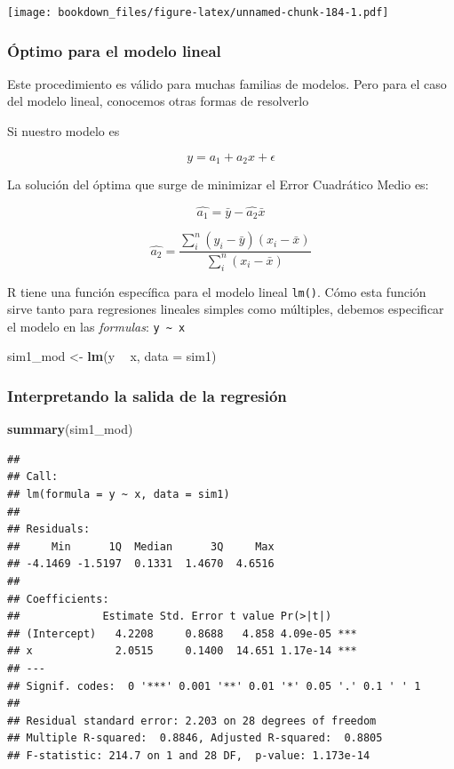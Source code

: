 \documentclass[]{book}
\newenvironment{Shaded}{\begin{snugshade}}{\end{snugshade}}
\newcommand{\DataTypeTok}[1]{\textcolor[rgb]{0.13,0.29,0.53}{#1}}
\newcommand{\KeywordTok}[1]{\textcolor[rgb]{0.13,0.29,0.53}{\textbf{#1}}}
\newcommand{\NormalTok}[1]{#1}
\newcommand{\OperatorTok}[1]{\textcolor[rgb]{0.81,0.36,0.00}{\textbf{#1}}}
\newcommand{\StringTok}[1]{\textcolor[rgb]{0.31,0.60,0.02}{#1}}
\begin{document}
\texttt{[image: bookdown\_files/figure-latex/unnamed-chunk-184-1.pdf]}

\hypertarget{optimo-para-el-modelo-lineal}{%
\subsubsection{Óptimo para el modelo lineal}\label{optimo-para-el-modelo-lineal}}

Este procedimiento es válido para muchas familias de modelos. Pero para el caso del modelo lineal, conocemos otras formas de resolverlo

Si nuestro modelo es

\[
y = a_1 + a_2x + \epsilon
\]

La solución del óptima que surge de minimizar el Error Cuadrático Medio es:

\[
\hat{a_1} = \bar{y} - \hat{a_2}\bar{x} 
\]

\[
\hat{a_2} = \frac{\sum_i^n (y_i -\bar{y})(x_i -\bar{x})}{\sum_i^n (x_i- \bar{x})}
\]

R tiene una función específica para el modelo lineal \texttt{lm()}. Cómo esta función sirve tanto para regresiones lineales simples como múltiples, debemos especificar el modelo en las \emph{formulas}: \texttt{y\ \textasciitilde{}\ x}

\begin{Shaded}
\begin{Highlighting}[]
\NormalTok{sim1_mod <-}\StringTok{ }\KeywordTok{lm}\NormalTok{(y }\OperatorTok{~}\StringTok{ }\NormalTok{x, }\DataTypeTok{data =}\NormalTok{ sim1)}
\end{Highlighting}
\end{Shaded}

\hypertarget{interpretando-la-salida-de-la-regresion}{%
\subsubsection{Interpretando la salida de la regresión}\label{interpretando-la-salida-de-la-regresion}}

\begin{Shaded}
\begin{Highlighting}[]
\KeywordTok{summary}\NormalTok{(sim1_mod)}
\end{Highlighting}
\end{Shaded}

\begin{verbatim}
## 
## Call:
## lm(formula = y ~ x, data = sim1)
## 
## Residuals:
##     Min      1Q  Median      3Q     Max 
## -4.1469 -1.5197  0.1331  1.4670  4.6516 
## 
## Coefficients:
##             Estimate Std. Error t value Pr(>|t|)    
## (Intercept)   4.2208     0.8688   4.858 4.09e-05 ***
## x             2.0515     0.1400  14.651 1.17e-14 ***
## ---
## Signif. codes:  0 '***' 0.001 '**' 0.01 '*' 0.05 '.' 0.1 ' ' 1
## 
## Residual standard error: 2.203 on 28 degrees of freedom
## Multiple R-squared:  0.8846, Adjusted R-squared:  0.8805 
## F-statistic: 214.7 on 1 and 28 DF,  p-value: 1.173e-14
\end{verbatim}
\end{document}
